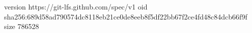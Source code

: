 version https://git-lfs.github.com/spec/v1
oid sha256:689d58ad790574dc8118eb21ce0de8eeb8f5df22bb67f2ce4fd48c84dcb66f9f
size 786528
